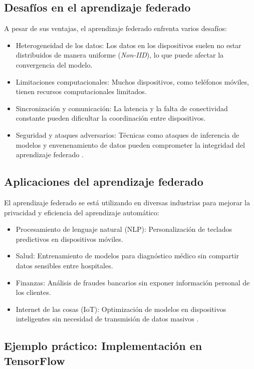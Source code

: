 \begin{itemize}
		\subsection{Desafíos en el aprendizaje federado}
		
		A pesar de sus ventajas, el aprendizaje federado enfrenta varios desafíos:
		
		\begin{itemize}
			\item Heterogeneidad de los datos: Los datos en los dispositivos suelen no estar distribuidos de manera uniforme (\textit{Non-IID}), lo que puede afectar la convergencia del modelo.
			\item Limitaciones computacionales: Muchos dispositivos, como teléfonos móviles, tienen recursos computacionales limitados.
			\item Sincronización y comunicación: La latencia y la falta de conectividad constante pueden dificultar la coordinación entre dispositivos.
			\item Seguridad y ataques adversarios: Técnicas como ataques de inferencia de modelos y envenenamiento de datos pueden comprometer la integridad del aprendizaje federado \cite{nasr2019comprehensive}.
		\end{itemize}
		
		\subsection{Aplicaciones del aprendizaje federado}
		
		El aprendizaje federado se está utilizando en diversas industrias para mejorar la privacidad y eficiencia del aprendizaje automático:
		
		\begin{itemize}
			\item Procesamiento de lenguaje natural (NLP): Personalización de teclados predictivos en dispositivos móviles.
			\item Salud: Entrenamiento de modelos para diagnóstico médico sin compartir datos sensibles entre hospitales.
			\item Finanzas: Análisis de fraudes bancarios sin exponer información personal de los clientes.
			\item Internet de las cosas (IoT): Optimización de modelos en dispositivos inteligentes sin necesidad de transmisión de datos masivos \cite{yang2019federated}.
		\end{itemize}
		
		\subsection{Ejemplo práctico: Implementación en TensorFlow}
		

\end{itemize}
